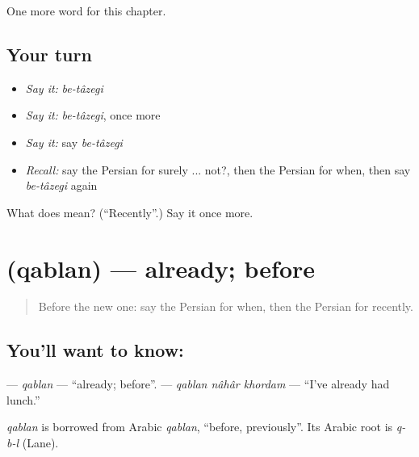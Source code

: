 \begin{grammarlens}[title={What you've built}]
One more word for this chapter.
\end{grammarlens}

\subsection*{Your turn}
\begin{itemize}
\raggedright
  \item \emph{Say it:} \emph{be-tâzegi}
  \item \emph{Say it:} \emph{be-tâzegi}, once more
  \item \emph{Say it:} say \emph{be-tâzegi}
  \item \emph{Recall:} say the Persian for surely ... not?, then the Persian for when, then say \emph{be-tâzegi} again
\end{itemize}

\begin{tcolorbox}[breakable,colback=teal!4,colframe=teal!35!black,title={Before you move on}]
What does   mean? (\textquotedblleft{}Recently\textquotedblright{}.) Say it once more.
\end{tcolorbox}
\section[\texorpdfstring{\fa{قبلا} (qablan)}{قبلا (qablan)}]{ (qablan) — already; before}

\label{lesson:FA-C137-qablan}



\begin{quote}
Before the new one: say the Persian for when, then the Persian for recently.
\end{quote}

\subsection*{You'll want to know: }
\textbf{} — \emph{qablan} — \textquotedblleft{}already; before\textquotedblright{}. \textbf{  } — \emph{qablan nâhâr khordam} — \textquotedblleft{}I've already had lunch.\textquotedblright{}

\begin{cousinweb}
\emph{qablan} is borrowed from Arabic \emph{qablan}, \textquotedblleft{}before, previously\textquotedblright{}. Its Arabic root is \emph{q-b-l} (Lane).
\end{cousinweb}

